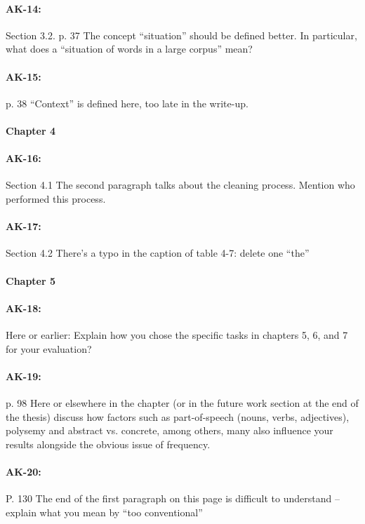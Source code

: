 \documentclass[11pt,a4paper]{article}
\begin{document}
{\paragraph{AK-14:} Section 3.2. p. 37 The concept “situation” should be defined better. In particular, what does a “situation of words in a large corpus” mean?

\paragraph{AK-15:} p. 38 “Context” is defined here, too late in the write-up.

\paragraph{Chapter 4}

\paragraph{AK-16:} Section 4.1 The second paragraph talks about the cleaning process. Mention who performed this process.

\paragraph{AK-17:} Section 4.2 There’s a typo in the caption of table 4-7: delete one “the”

\paragraph{Chapter 5}

\paragraph{AK-18:} Here or earlier: Explain how you chose the specific tasks in chapters 5, 6, and 7 for your evaluation?

\paragraph{AK-19:} p. 98 Here or elsewhere in the chapter (or in the future work section at the end of the thesis) discuss how factors such as part-of-speech (nouns, verbs, adjectives), polysemy and abstract vs. concrete, among others, many also influence your results alongside the obvious issue of frequency.

\paragraph{AK-20:} P. 130 The end of the first paragraph on this page is difficult to understand – explain what you mean by “too conventional”

}
\end{document}
